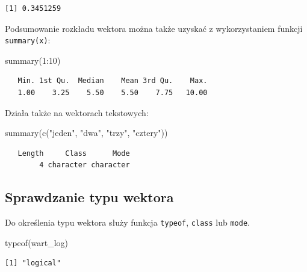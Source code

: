 \documentclass[
  letterpaper,
  DIV=11,
  numbers=noendperiod]{scrreprt}
\newenvironment{Shaded}{\begin{snugshade}}{\end{snugshade}}
\newcommand{\DecValTok}[1]{\textcolor[rgb]{0.68,0.00,0.00}{#1}}
\newcommand{\FunctionTok}[1]{\textcolor[rgb]{0.28,0.35,0.67}{#1}}
\newcommand{\NormalTok}[1]{\textcolor[rgb]{0.00,0.23,0.31}{#1}}
\newcommand{\SpecialCharTok}[1]{\textcolor[rgb]{0.37,0.37,0.37}{#1}}
\newcommand{\StringTok}[1]{\textcolor[rgb]{0.13,0.47,0.30}{#1}}
\begin{document}
\begin{verbatim}
[1] 0.3451259
\end{verbatim}

Podsumowanie rozkładu wektora można także uzyskać z wykorzystaniem
funkcji \texttt{summary(x)}:

\begin{Shaded}
\begin{Highlighting}[]
\FunctionTok{summary}\NormalTok{(}\DecValTok{1}\SpecialCharTok{:}\DecValTok{10}\NormalTok{)}
\end{Highlighting}
\end{Shaded}

\begin{verbatim}
   Min. 1st Qu.  Median    Mean 3rd Qu.    Max. 
   1.00    3.25    5.50    5.50    7.75   10.00 
\end{verbatim}

Działa także na wektorach tekstowych:

\begin{Shaded}
\begin{Highlighting}[]
\FunctionTok{summary}\NormalTok{(}\FunctionTok{c}\NormalTok{(}\StringTok{"jeden"}\NormalTok{, }\StringTok{"dwa"}\NormalTok{, }\StringTok{"trzy"}\NormalTok{, }\StringTok{"cztery"}\NormalTok{))}
\end{Highlighting}
\end{Shaded}

\begin{verbatim}
   Length     Class      Mode 
        4 character character 
\end{verbatim}

\hypertarget{sprawdzanie-typu-wektora}{%
\subsection{Sprawdzanie typu wektora}\label{sprawdzanie-typu-wektora}}

Do określenia typu wektora służy funkcja \texttt{typeof}, \texttt{class}
lub \texttt{mode}.

\begin{Shaded}
\begin{Highlighting}[]
\FunctionTok{typeof}\NormalTok{(wart\_log)}
\end{Highlighting}
\end{Shaded}

\begin{verbatim}
[1] "logical"
\end{verbatim}
\end{document}
